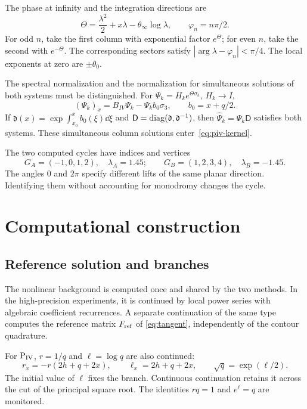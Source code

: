 The phase at infinity and the integration directions are
\begin{equation*}
 \Theta=\frac{\lambda^2}{2}+x\lambda-\theta_\infty\log\lambda,
 \qquad\varphi_n=n\pi/2.
\end{equation*}
For odd $n$, take the first column with exponential factor $e^\Theta$;
for even $n$, take the second with $e^{-\Theta}$. The corresponding
sectors satisfy $|\arg\lambda-\varphi_n|<\pi/4$.
The local exponents at zero are $\pm\theta_0$.

The spectral normalization and the normalization for simultaneous
solutions of both systems must be distinguished. For
$\Psi_k=H_k e^{\Theta\sigma_3}$, $H_k\to I$,
\[
 (\Psi_k)_x=B_{IV}\Psi_k-\Psi_k b_0\sigma_3,\qquad b_0=x+q/2.
\]
If $\mathfrak d(x)=\exp\int_{x_0}^x b_0(\xi)\dd\xi$ and
$\mathsf D=\operatorname{diag}(\mathfrak d,\mathfrak d^{-1})$, then
$\widehat\Psi_k=\Psi_k\mathsf D$ satisfies both systems.
These simultaneous column solutions enter~\eqref{eq:piv-kernel}.

The two computed cycles have indices and vertices
\begin{equation*}
 G_A=(-1,0,1,2),\quad\lambda_A=1.45;\qquad
 G_B=(1,2,3,4),\quad\lambda_B=-1.45.
\end{equation*}
The angles $0$ and $2\pi$ specify different lifts of the same planar
direction. Identifying them without accounting for monodromy changes
the cycle.

\section{Computational construction}\label{sec:algorithm}
\subsection{Reference solution and branches}
The nonlinear background is computed once and shared by the two methods.
In the high-precision experiments, it is continued by local power series
with algebraic coefficient recurrences. A separate continuation of the
same type computes the reference matrix $F_{\rm ref}$ of
\eqref{eq:tangent}, independently of the contour quadrature.

For $\mathrm{P}_{\mathrm{IV}}$, $r=1/q$ and $\ell=\log q$ are also continued:
\begin{equation}\label{eq:branches}
 r_x=-r(2h+q+2x),\qquad\ell_x=2h+q+2x,\qquad
 \sqrt q=\exp(\ell/2).
\end{equation}
The initial value of $\ell$ fixes the branch. Continuous continuation
retains it across the cut of the principal square root.
The identities $rq=1$ and $e^\ell=q$ are monitored.

